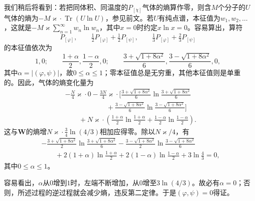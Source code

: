 \documentclass[fontsize=13pt,twoside,openany,headings=normal,parskip=false,bookmarkpackage=false,DIV=calc]{scrbook}
\begin{document}
我们稍后将看到：若把同体积、同温度的$P_{[\chi]}$气体的熵算作零，则含$M$个分子的$U$气体的熵为$-M\varkappa\cdot\operatorname{Tr}(U\ln U)$，参见前文。若$U$有纯点谱，本征值为$w_1,\allowbreak w_2,\allowbreak \ldots$，这就是$-M\varkappa\sum_{n=1}^{\infty}w_n\ln w_n$，其中$x=0$时约定$x\ln x=0$。容易算出，算符
\[
P_{[\varphi]},\qquad\tfrac12P_{[\varphi]}+\tfrac12P_{[\psi]},\qquad
\tfrac13P_{[\varphi]}+\tfrac23P_{[\psi]}
\]
的本征值依次为
\[
1,0;\qquad \frac{1+\alpha}2,\frac{1-\alpha}2,0;\qquad
\frac{3+\sqrt{1+8\alpha^2}}6,\frac{3-\sqrt{1+8\alpha^2}}6,0,
\]
其中$\alpha=|(\varphi,\allowbreak \psi)|$，故$0\leq\alpha\leq1$；零本征值总是无穷重，其他本征值则是单重的。因此，气体的熵变化量为
\begin{align*}
&-\frac N4\varkappa\cdot0
-\frac{3N}4\varkappa\cdot\Biggl[
\frac{3+\sqrt{1+8\alpha^2}}6\ln\frac{3+\sqrt{1+8\alpha^2}}6\\
&\qquad\qquad\qquad+\frac{3-\sqrt{1+8\alpha^2}}6\ln\frac{3-\sqrt{1+8\alpha^2}}6\Biggr]\\
&\qquad+N\varkappa\cdot\left(\frac{1+\alpha}2\ln\frac{1+\alpha}2
+\frac{1-\alpha}2\ln\frac{1-\alpha}2\right).
\end{align*}\hypertarget{origpage-200}{}\label{origpage-200}这与$\boldsymbol{W}$的熵增$N\varkappa\cdot\tfrac34\ln(4/3)$相加应得零。除以$N\varkappa/4$，有
\begin{align*}
&-\frac{3+\sqrt{1+8\alpha^2}}2\ln\frac{3+\sqrt{1+8\alpha^2}}6
-\frac{3-\sqrt{1+8\alpha^2}}2\ln\frac{3-\sqrt{1+8\alpha^2}}6\\
&\qquad+2(1+\alpha)\ln\frac{1+\alpha}2
+2(1-\alpha)\ln\frac{1-\alpha}2+3\ln\frac43=0,
\end{align*}
其中$0\leq\alpha\leq1$。

容易看出，$\alpha$从$0$增到$1$时，左端不断增加，从$0$增至$3\ln(4/3)$。故必有$\alpha=0$；否则，所述过程的逆过程就会减少熵，违反第二定律。于是$(\varphi,\allowbreak \psi)=0$得证。
\end{document}
